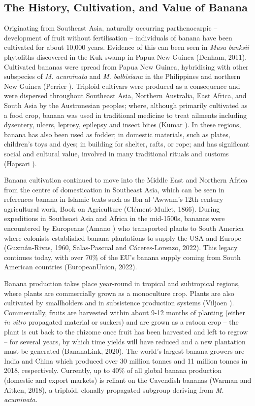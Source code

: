 \subsection{The History, Cultivation, and Value of Banana}

Originating from Southeast Asia, naturally occurring parthenocarpic – development of fruit without fertilisation – individuals of banana have been cultivated for about 10,000 years. Evidence of this can been seen in \textit{Musa banksii }phytoliths discovered in the Kuk swamp in Papua New Guinea (Denham, 2011). Cultivated bananas were spread from Papua New Guinea, hybridising with other subspecies of \textit{M. acuminata} and \textit{M. balbisiana} in the Philippines and northern New Guinea (Perrier ). Triploid cultivars were produced as a consequence and were dispersed throughout Southeast Asia, Northern Australia, East Africa, and South Asia by the Austronesian peoples; where, although primarily cultivated as a food crop, banana was used in traditional medicine to treat ailments including dysentery, ulcers, leprosy, epilepsy and insect bites (Kumar ). In these regions, banana has also been used as fodder; in domestic materials, such as plates, children’s toys and dyes; in building for shelter, rafts, or rope; and has significant social and cultural value, involved in many traditional rituals and customs (Hapsari ).  

Banana cultivation continued to move into the Middle East and Northern Africa from the centre of domestication in Southeast Asia, which can be seen in references banana in Islamic texts such as Ibn al-'Awwam's 12th-century agricultural work, Book on Agriculture (Clément-Mullet, 1866). During expeditions in Southeast Asia and Africa in the mid-1500s, bananas were encountered by Europeans (Amano ) who transported plants to South America where colonists established banana plantations to supply the USA and Europe (Guzmán-Rivas, 1960, Salas-Pascual and Cáceres-Lorenzo, 2022). This legacy continues today, with over 70\% of the EU’s banana supply coming from South American countries (EuropeanUnion, 2022).  

Banana production takes place year-round in tropical and subtropical regions, where plants are commercially grown as a monoculture crop. Plants are also cultivated by smallholders and in subsistence production systems (Viljoen ). Commercially, fruits are harvested within about 9-12 months of planting (either\textit{ in vitro} propagated material or suckers) and are grown as a ratoon crop – the plant is cut back to the rhizome once fruit has been harvested and left to regrow – for several years, by which time yields will have reduced and a new plantation must be generated (BananaLink, 2020). The world’s largest banana growers are India and China which produced over 30 million tonnes and 11 million tonnes in 2018, respectively.  Currently, up to 40\% of all global banana production (domestic and export markets) is reliant on the Cavendish bananas (Warman and Aitken, 2018), a triploid, clonally propagated subgroup deriving from \textit{M. acuminata. } 

